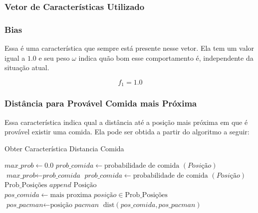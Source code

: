 \subsubsection{Vetor de Características Utilizado}

\subsubsection*{Bias}

Essa é uma característica que sempre está presente nesse vetor. Ela tem um valor igual a $ 1.0 $ e seu peso $ \omega $ indica quão bom esse comportamento é, independente da situação atual.

$$ f_1 = 1.0 $$

\subsubsection*{Distância para Provável Comida mais Próxima} \label{subsubsection:DistProvavelComida}

Essa característica indica qual a distância até a posição mais próxima em que é provável existir uma comida. Ela pode ser obtida a partir do algoritmo a seguir:

\begin{algorithm}[H]
	\caption{Obter Característica Distancia Comida} \label{algorithm:ObterCaracteristicaDistanciaComida}
	\begin{algorithmic}[1]
			\State $\textit{max\_prob} \gets 0.0 $
				\State $\textit{prob\_comida} \gets \text{probabilidade de comida } \left( \textit{Posição} \right) $
					\State $\textit{max\_prob} \gets \textit{prob\_comida} $
				\EndIf 
			\EndFor
				\State $\textit{prob\_comida} \gets \text{probabilidade de comida } \left( \textit{Posição} \right) $
					\State $ \text{Prob\_Posições } append \text{ Posição} $
				\EndIf 
			\EndFor
			\State $\textit{pos\_comida} \gets \text{mais proxima }\textit{posição} \in \text{Prob\_Posições} $
			\State $\textit{pos\_pacman} \gets \text{posição }\textit{pacman} $
			\State \Return $ \text{dist} \left( \textit{pos\_comida}, \textit{pos\_pacman} \right) $
		\EndProcedure
	\end{algorithmic}
\end{algorithm}

